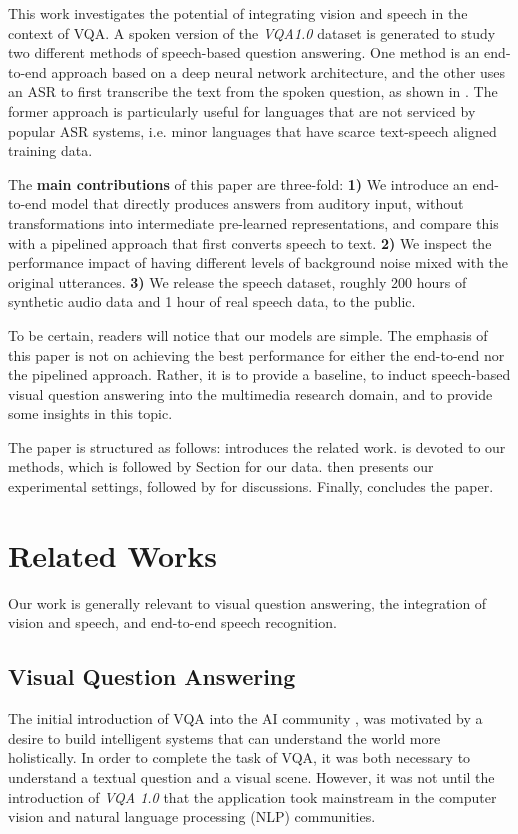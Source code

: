\documentclass[letterpaper]{article} %
\begin{document}
This work investigates the potential of integrating vision and speech in the context of VQA. A spoken version of the \textit{VQA1.0} dataset is generated to study two different methods of speech-based question answering. One method is an end-to-end approach based on a deep neural network architecture, and the other uses an ASR to first transcribe the text from the spoken question, as shown in . The former approach is particularly useful for languages that are not serviced by popular ASR systems, i.e. minor languages that have scarce text-speech aligned training data.

The \textbf{main contributions} of this paper are three-fold: \textbf{1)} We introduce an end-to-end model that directly produces answers from auditory input, without transformations into intermediate pre-learned representations, and compare this with a pipelined approach that first converts speech to text. \textbf{2)} We inspect the performance impact of having different levels of background noise mixed with the original utterances. \textbf{3)} We release the speech dataset, roughly 200 hours of synthetic audio data and 1 hour of real speech data, to the public.

To be certain, readers will notice that our models are simple. The emphasis of this paper is not on achieving the best performance for either the end-to-end nor the pipelined approach. Rather, it is to provide a baseline, to induct speech-based visual question answering into the multimedia research domain, and to provide some insights in this topic.

The paper is structured as follows:  introduces the related work.  is devoted to our methods, which is followed by Section  for our data.  then presents our experimental settings, followed by  for discussions. Finally,  concludes the paper.   

\section{Related Works}
\label{sec:related}
Our work is generally relevant to visual question answering, the integration of vision and speech, and end-to-end speech recognition.

\subsection{Visual Question Answering}
The initial introduction of VQA into the AI community ,  was motivated by a desire to build intelligent systems that can understand the world more holistically. In order to complete the task of VQA, it was both necessary to understand a textual question and a visual scene. However, it was not until the introduction of \textit{VQA 1.0}  that the application took mainstream in the computer vision and natural language processing (NLP) communities.
\end{document}
